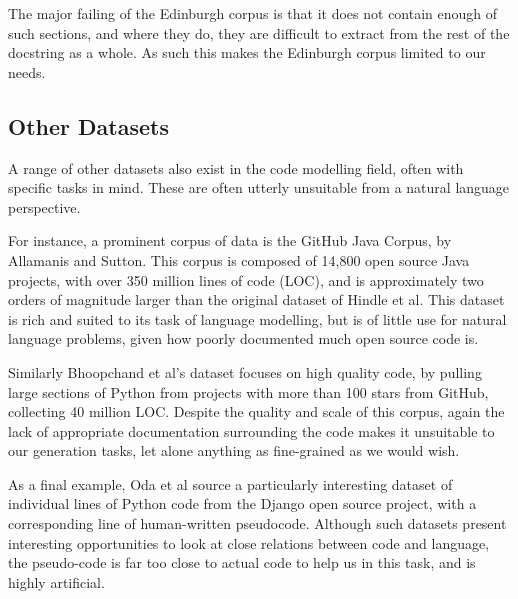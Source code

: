 
The major failing of the Edinburgh corpus is that it does not contain enough of such sections, and where they do, they are difficult to extract from the rest of the docstring as a whole.
As such this makes the Edinburgh corpus limited to our needs.


\subsection{Other Datasets}
A range of other datasets also exist in the code modelling field, often with specific tasks in mind. These are often utterly unsuitable from a natural language perspective.

For instance, a prominent corpus of data is the GitHub Java Corpus, by Allamanis and Sutton\cite{allamanis_mining_2013}. This corpus is composed of 14,800 open source Java projects, with over 350 million lines of code (LOC), and is approximately two orders of magnitude larger than the original dataset of Hindle et al. This dataset is rich and suited to its task of language modelling, but is of little use for natural language problems, given how poorly documented much open source code is.

Similarly Bhoopchand et al's \cite{bhoopchand_learning_2016} dataset focuses on high quality code, by pulling large sections of Python from projects with more than 100 stars from GitHub, collecting 40 million LOC. 
Despite the quality and scale of this corpus, again the lack of appropriate documentation surrounding the code makes it unsuitable to our generation tasks, let alone anything as fine-grained as we would wish.

As a final example, Oda et al\cite{oda_learning_nodate} source a particularly interesting dataset of individual lines of Python code from the Django open source project, with a corresponding line of human-written pseudocode. Although such datasets present interesting opportunities to look at close relations between code and language, the pseudo-code is far too close to actual code to help us in this task, and is highly artificial. 



